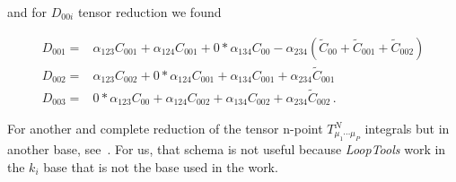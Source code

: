 and for $D_{00i}$ tensor reduction we found

\begin{align}
\label{eq:D00i-reduction}
D_{001} =& \alpha_{123}C_{001}+\alpha_{124}C_{001}+0*\alpha_{134}C_{00}-\alpha_{234}\left(\tilde{C}_{00}+\tilde{C}_{001}+\tilde{C}_{002}\right)\nonumber \\
D_{002} =& \alpha_{123}C_{002}+0*\alpha_{124}C_{001}+\alpha_{134}C_{001}+\alpha_{234}\tilde{C}_{001}\nonumber \\
D_{003} =& 0*\alpha_{123}C_{00}+\alpha_{124}C_{002}+\alpha_{134}C_{002}+\alpha_{234}\tilde{C}_{002}\,.
\end{align}

\noindent
For another and complete reduction of the tensor n-point $T^N_{\mu_1\cdots \mu_{P}}$ integrals but in another base, see~\cite{STUART1988367}. For us, that schema is not useful because \textit{LoopTools} work in the $k_i$ base that is not the base used in the work. 









